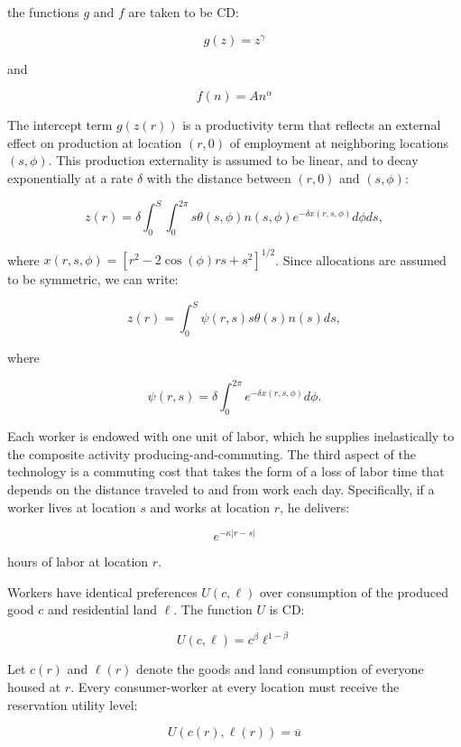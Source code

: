 the functions $g$ and $f$ are taken to be CD:

\begin{equation}
    g(z) = z^{\gamma}
\end{equation}

and

\begin{equation}
    f(n) = An^{\alpha}
\end{equation}

The intercept term $g(z(r))$ is a productivity term that reflects an external effect on production at location $(r, 0)$ of employment at neighboring locations $(s, \phi)$. This production externality is assumed to be linear, and to decay exponentially at a rate $\delta$ with the distance between $(r, 0)$ and $(s, \phi)$:

\begin{equation*}
    z(r) = \delta \int_0^S \int_0^{2\pi} s\theta(s, \phi)n(s, \phi) e^{-\delta x(r, s, \phi)} d\phi ds,
\end{equation*}

where $x(r, s, \phi) = [r^2 - 2\cos(\phi)rs + s^2]^{1/2}$. Since allocations are assumed to be symmetric, we can write:

\begin{equation}
    z(r) = \int_0^S \psi(r, s)s \theta(s)n(s)ds,
\end{equation}

where

\begin{equation}
    \psi(r, s) = \delta \int_0^{2\pi} e^{-\delta x(r, s, \phi)}d\phi.
\end{equation}

Each worker is endowed with one unit of labor, which he supplies inelastically to the composite activity producing-and-commuting. The third aspect of the technology is a commuting cost that takes the form of a loss of labor time that depends on the distance traveled to and from work each day. Specifically, if a worker lives at location $s$ and works at location $r$, he delivers:

\begin{equation*}
    e^{-\kappa |r - s|}
\end{equation*}

hours of labor at location $r$.

Workers have identical preferences $U(c, \ell)$ over consumption of the produced good $c$ and residential land $\ell$. The function $U$ is CD:

\begin{equation}
    U(c, \ell) = c^{\beta}\ell^{1 - \beta}
\end{equation}

Let $c(r)$ and $\ell(r)$ denote the goods and land consumption of everyone housed at $r$. Every consumer-worker at every location must receive the reservation utility level:

\begin{equation}
    U(c(r), \ell(r)) = \overline{u}
\end{equation}